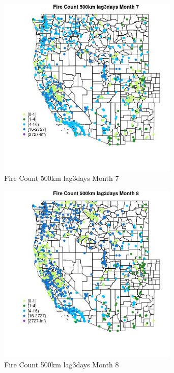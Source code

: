 \begin{figure} 
\centering  
\includegraphics[width=0.77\textwidth]{Code_Outputs/Report_ML_input_PM25_Step4_part_f_de_duplicated_aveswNAs_MapObsMo7Fire_Count_500km_lag3days.jpg} 
\caption{\label{fig:Report_ML_input_PM25_Step4_part_f_de_duplicated_aveswNAsMapObsMo7Fire_Count_500km_lag3days}Fire Count 500km lag3days Month 7} 
\end{figure} 
 

\clearpage 

\begin{figure} 
\centering  
\includegraphics[width=0.77\textwidth]{Code_Outputs/Report_ML_input_PM25_Step4_part_f_de_duplicated_aveswNAs_MapObsMo8Fire_Count_500km_lag3days.jpg} 
\caption{\label{fig:Report_ML_input_PM25_Step4_part_f_de_duplicated_aveswNAsMapObsMo8Fire_Count_500km_lag3days}Fire Count 500km lag3days Month 8} 
\end{figure} 
 

